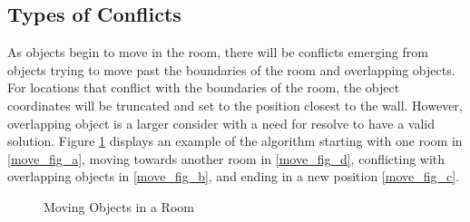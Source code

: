 \documentclass[sigconf,authordraft]{acmart}
\begin{document}
    \subsection{Types of Conflicts}
    As objects begin to move in the room, there will be conflicts emerging from objects trying to move past the boundaries of the room and overlapping objects. For locations that conflict with the boundaries of the room, the object coordinates will be truncated and set to the position closest to the wall. However, overlapping object is a larger consider with a need for resolve to have a valid solution. Figure \ref{move_fig} displays an example of the algorithm starting with one room in \ref{move_fig_a}, moving towards another room in \ref{move_fig_d}, conflicting with overlapping objects in \ref{move_fig_b}, and ending in a new position \ref{move_fig_c}.
        \begin{figure}[!h]
        \centering
        \hfill
        \caption{Moving Objects in a Room}
        \label{move_fig}
    \end{figure}
    
\end{document}
